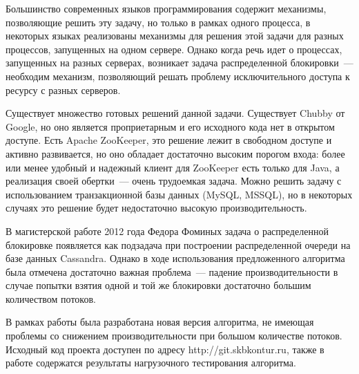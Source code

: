 Большинство современных языков программирования содержит механизмы, позволяющие решить эту задачу, но только в рамках одного процесса, в некоторых языках реализованы механизмы для решения этой задачи для разных процессов, запущенных на одном сервере. Однако когда речь идет о процессах, запущенных на разных серверах, возникает задача распределенной блокировки~--- необходим механизм, позволяющий решать проблему исключительного доступа к ресурсу с разных серверов.

Существует множество готовых решений данной задачи. Существует Chubby от Google, но оно является проприетарным и его исходного кода нет в открытом доступе. Есть Apache ZooKeeper, это решение лежит в свободном доступе и активно развивается, но оно обладает достаточно высоким порогом входа: более или менее удобный и надежный клиент для ZooKeeper есть только для Java, а реализация своей обертки~--- очень трудоемкая задача. Можно решить задачу с использованием транзакционной базы данных (MySQL, MSSQL), но в некоторых случаях это решение будет недостаточно высокую производительность.

В магистерской работе 2012 года Федора Фоминых задача о распределенной блокировке появляется как подзадача при построении распределенной очереди на базе данных Cassandra. Однако в ходе использования предложенного алгоритма была отмечена достаточно важная проблема~--- падение производительности в случае попытки взятия одной и той же блокировки достаточно большим количеством потоков.

В рамках работы была разработана новая версия алгоритма, не имеющая проблемы со снижением производительности при большом количестве потоков. Исходный код проекта доступен по адресу http://git.skbkontur.ru, также в работе содержатся результаты нагрузочного тестирования алгоритма.